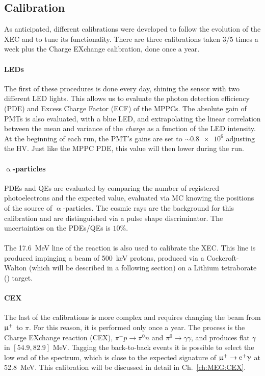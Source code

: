 \begin{refsection}
    \subsection{Calibration}    
    \label{sec:MEG:XEC:calibrations}
    As anticipated, different calibrations were developed to follow the evolution of the XEC and to tune its functionality. 
    There are three calibrations taken 3/5 times a week plus the Charge EXchange calibration, done once a year.
    
    \paragraph{LEDs} The first of these procedures is done every day, shining the sensor with two different LED lights. 
    This allows us to evaluate the photon detection efficiency (PDE) and Excess Charge Factor (ECF) of the MPPCs.
    The absolute gain of PMTs is also evaluated, with a blue LED, and extrapolating the linear correlation between the mean and variance of the \textit{charge} as a function of the LED intensity. 
    At the beginning of each run, the PMT's gains are set to $\sim\num{0.8e6}$ adjusting the HV. 
    Just like the MPPC PDE, this value will then lower during the run.

    \paragraph{$\upalpha$-particles} PDEs and QEs are evaluated by comparing the number of registered photoelectrons and the expected value, evaluated via MC knowing the positions of the  source of $\upalpha$-particles.
    The cosmic rays are the background for this calibration and are distinguished via a pulse shape discriminator.
    The uncertainties on the PDEs/QEs is $10\%$.

    \paragraph{}
    The \SI{17.6}{MeV} line of the  reaction is also used to calibrate the XEC.
    This line is produced impinging a beam of \SI{500}{keV} protons, produced via a Cockcroft-Walton (which will be described in a following section) on a Lithium tetraborate () target.

    \paragraph{CEX}
    The last of the calibrations is more complex and requires changing the beam from $\upmu^+$ to $\pi$. 
    For this reason, it is performed only once a year.
    The process is the Charge EXchange reaction (CEX), $\pi^-p\rightarrow \pi^0n$ and $\pi^0\rightarrow\gamma\gamma$, and produces flat $\gamma$ in $[54.9,82.9]$ MeV.
    Tagging the back-to-back events it is possible to select the low end of the spectrum, which is close to the expected signature of $\upmu^+\rightarrow\text{e}^+\upgamma$ at \SI{52.8}{MeV}. This calibration will be discussed in detail in Ch.~\ref{ch:MEG:CEX}.


\end{refsection}

